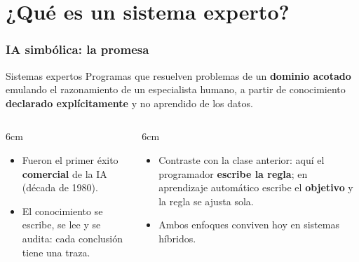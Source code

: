 \documentclass[aspectratio=169, 10pt]{beamer}
\begin{document}
\section{¿Qué es un sistema experto?}

\begin{frame}
\frametitle{IA simbólica: la promesa}
\begin{block}{Sistemas expertos}
Programas que resuelven problemas de un \textbf{dominio acotado} emulando el razonamiento de un especialista humano, a partir de conocimiento \textbf{declarado explícitamente} y no aprendido de los datos.
\end{block}
\pause
\begin{columns}[T]
\begin{column}{6cm}
\begin{itemize}
	\item Fueron el primer \'exito \textbf{comercial} de la IA (d\'ecada de 1980).
	\item El conocimiento se escribe, se lee y se audita: cada conclusi\'on tiene una traza.
\end{itemize}
\end{column}
\begin{column}{6cm}
\begin{itemize}
	\item Contraste con la clase anterior: aqu\'i el programador \textbf{escribe la regla}; en aprendizaje autom\'atico escribe el \textbf{objetivo} y la regla se ajusta sola.
	\item Ambos enfoques conviven hoy en sistemas h\'ibridos.
\end{itemize}
\end{column}
\end{columns}
\end{frame}
\end{document}
